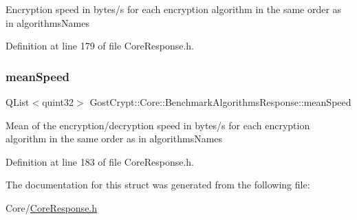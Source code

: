 Encryption speed in bytes/s for each encryption algorithm in the same order as in algorithms\+Names 

Definition at line 179 of file Core\+Response.\+h.

\mbox{\label{struct_gost_crypt_1_1_core_1_1_benchmark_algorithms_response_ab066f79449c10e70cdd7142d8c16ae13}} 
\subsubsection{\texorpdfstring{mean\+Speed}{meanSpeed}}
{\footnotesize\ttfamily Q\+List$<$quint32$>$ Gost\+Crypt\+::\+Core\+::\+Benchmark\+Algorithms\+Response\+::mean\+Speed}

Mean of the encryption/decryption speed in bytes/s for each encryption algorithm in the same order as in algorithms\+Names 

Definition at line 183 of file Core\+Response.\+h.



The documentation for this struct was generated from the following file\+:\begin{DoxyCompactItemize}
\item 
Core/\hyperlink{_core_response_8h}{Core\+Response.\+h}\end{DoxyCompactItemize}
